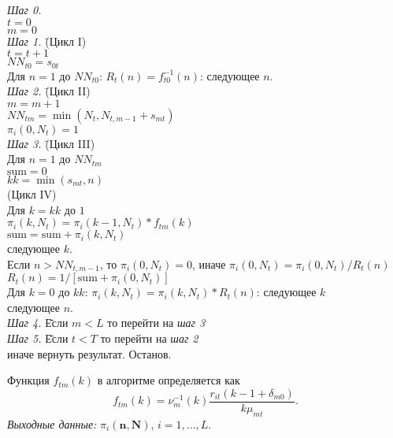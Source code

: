 \begin{tabbing}
\textit{Шаг 0.} \= \\
\> $t = 0$ \\
\> $m = 0$ \\
\textit{Шаг 1.} \= (Цикл I) \\
\> $t = t + 1$ \\
\> $\textit{NN}_{t0} = s_{0t}$ \\
\>  Для $n=1$ до $\textit{NN}_{t0}$: $R_t(n) = f_{t0}^{-1}(n)$: следующее $n$. \\
\textit{Шаг 2.} \= (Цикл II) \\
\> $m = m + 1$ \\
\> $\textit{NN}_{tm} = \min(N_t, N_{t,m-1} + s_{mt})$ \\
\> $\pi_i(0,N_t) = 1$ \\
\textit{Шаг 3.} \= (Цикл III) \\
\> Для $n=1$ до $\textit{NN}_{tm}$ \\
\> \quad $\text{sum} = 0$ \\
\> \quad $kk = \min(s_{mt},n)$ \\
\> \quad (Цикл IV) \\
\> \quad Для $k = kk$ до $1$ \\
\> \quad \quad $\pi_i(k,N_t) = \pi_i(k-1,N_t) * f_{tm}(k)$ \\
\> \quad \quad $\text{sum} = \text{sum} + \pi_i(k,N_t)$ \\
\> \quad следующее $k$. \\
\> \quad Если $n > \textit{NN}_{t,m-1}$, то $\pi_i(0,N_t) = 0$, иначе $\pi_i(0,N_t) = \pi_i(0,N_t)/R_t(n)$ \\
\> \quad $R_t(n) = 1 / [\text{sum} + \pi_i(0,N_t)]$ \\
\> \quad Для $k = 0$ до $kk$: $\pi_i(k,N_t) = \pi_i(k,N_t) * R_t(n)$: следующее $k$ \\
\> следующее $n$. \\
\textit{Шаг 4.} \= Если $m < L$ то перейти на \textit{шаг 3} \\
\textit{Шаг 5.} \= Если $t < T$ то перейти на \textit{шаг 2} \\
\> иначе вернуть результат. Останов.
\end{tabbing}
Функция $f_{tm}(k)$ в алгоритме определяется как
\begin{equation*}
f_{tm}(k) = \nu_m^{-1}(k) \frac{r_{it}(k-1+\delta_{m0})}{k \mu_{mt}}.
\end{equation*}
\emph{Выходные данные:} $\pi_i(\mathbf{n},\mathbf{N})$, $i=1,...,L$.

